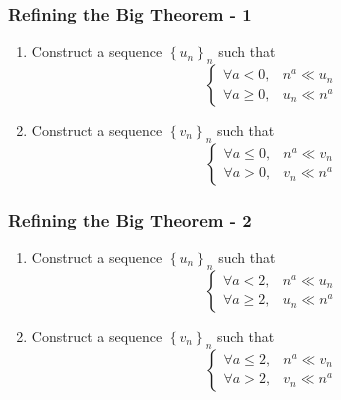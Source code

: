 \documentclass[14pt]{beamer}
\begin{document}
\begin{frame}[t]
	\frametitle{Refining the Big Theorem - 1}

	\begin{enumerate}
		\item Construct a sequence $\displaystyle \left\{ u_{n} \right\}_{n}$ such that
			\[
				\begin{cases}
					\forall a < 0,    & n^{a}\ll u_{n} \\
					\forall a \geq 0, & u_{n}\ll n^{a}
				\end{cases}
			\]

		\item Construct a sequence $\displaystyle \left\{ v_{n} \right\}_{n}$ such that
			\[
				\begin{cases}
					\forall a \leq 0, & n^{a}\ll v_{n} \\
					\forall a > 0,    & v_{n}\ll n^{a}
				\end{cases}
			\]
	\end{enumerate}
\end{frame}

\begin{frame}[t]
	\frametitle{Refining the Big Theorem - 2}

	\begin{enumerate}
		\item Construct a sequence $\displaystyle \left\{ u_{n} \right\}_{n}$ such that
			\[
				\begin{cases}
					\forall a < 2,    & n^{a}\ll u_{n} \\
					\forall a \geq 2, & u_{n}\ll n^{a}
				\end{cases}
			\]

		\item Construct a sequence $\displaystyle \left\{ v_{n} \right\}_{n}$ such that
			\[
				\begin{cases}
					\forall a \leq 2, & n^{a}\ll v_{n} \\
					\forall a > 2,    & v_{n}\ll n^{a}
				\end{cases}
			\]
	\end{enumerate}
\end{frame}
\end{document}
